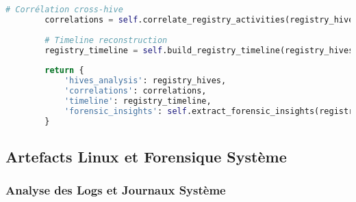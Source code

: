 \begin{lstlisting}[language=Python, caption=Analyseur Prefetch avec intelligence temporelle]
        # Corrélation cross-hive
        correlations = self.correlate_registry_activities(registry_hives)
        
        # Timeline reconstruction
        registry_timeline = self.build_registry_timeline(registry_hives)
        
        return {
            'hives_analysis': registry_hives,
            'correlations': correlations,
            'timeline': registry_timeline,
            'forensic_insights': self.extract_forensic_insights(registry_hives)
        }
\end{lstlisting}

\subsection{Artefacts Linux et Forensique Système}

\subsubsection{Analyse des Logs et Journaux Système}


